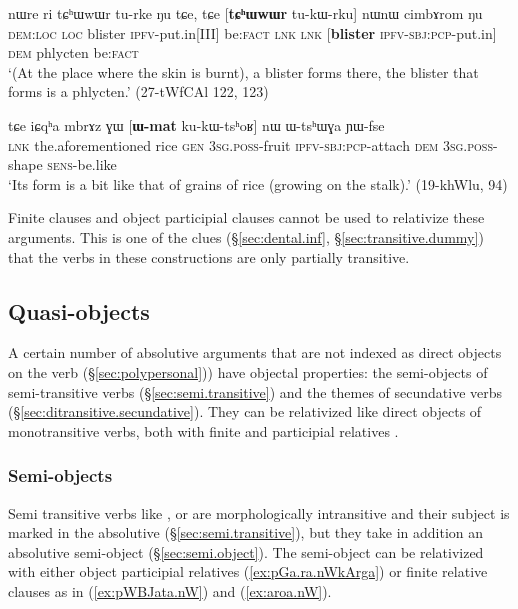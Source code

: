 \begin{exe}
\ex \label{ex:tCHWwWr.turke}
\gll nɯre ri tɕʰɯwɯr tu-rke ŋu tɕe, tɕe [\textbf{tɕʰɯwɯr} tu-kɯ-rku] nɯnɯ cimbɤrom ŋu \\
\textsc{dem}:\textsc{loc} \textsc{loc} blister \textsc{ipfv}-put.in[III] be:\textsc{fact} \textsc{lnk} \textsc{lnk} [\textbf{blister} \textsc{ipfv}-\textsc{sbj}:\textsc{pcp}-put.in] \textsc{dem} phlycten be:\textsc{fact} \\
\glt `(At the place where the skin is burnt), a blister forms there, the blister that forms is a phlycten.' (27-tWfCAl 122, 123)
\end{exe} 

\begin{exe}
\ex \label{ex:Wmat.kukWtshoR}
\gll tɕe iɕqʰa mbrɤz ɣɯ [\textbf{ɯ-mat} ku-kɯ-tsʰoʁ] nɯ ɯ-tsʰɯɣa ɲɯ-fse \\
\textsc{lnk} the.aforementioned rice \textsc{gen} \textsc{3sg}.\textsc{poss}-fruit \textsc{ipfv}-\textsc{sbj}:\textsc{pcp}-attach \textsc{dem} \textsc{3sg}.\textsc{poss}-shape \textsc{sens}-be.like \\
\glt `Its form is a bit like that of grains of rice (growing on the stalk).' (19-khWlu, 94)
\end{exe}

Finite clauses and object participial clauses cannot be used to relativize these arguments. This is one of the clues (§\ref{sec:dental.inf}, §\ref{sec:transitive.dummy}) that the verbs in these constructions are only partially transitive.

\subsection{Quasi-objects} \label{sec:semi.object.relativization}
A certain number of absolutive arguments that are not indexed as direct objects on the verb (§\ref{sec:polypersonal})) have objectal properties: the semi-objects of
semi-transitive verbs (§\ref{sec:semi.transitive}) and the themes of secundative verbs (§\ref{sec:ditransitive.secundative}). They can be
relativized like direct objects of monotransitive verbs, both with finite and participial
relatives \citep{jacques16relatives}.


  \subsubsection{Semi-objects}  \label{sec:semi.tr.relativization}
 Semi transitive verbs like ,  or  are morphologically intransitive and their subject is marked in the absolutive (§\ref{sec:semi.transitive}), but they take in addition an absolutive semi-object (§\ref{sec:semi.object}). The semi-object can be relativized with either object participial relatives (\ref{ex:pGa.ra.nWkArga}) or finite relative clauses as in (\ref{ex:pWBJata.nW}) and (\ref{ex:aroa.nW}).
 
